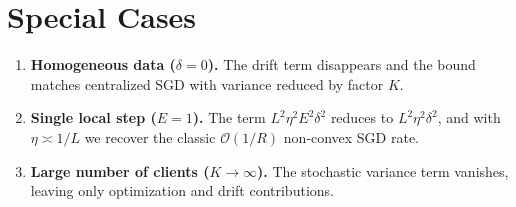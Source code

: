\documentclass{article}
\begin{document}
\section*{Special Cases}
\begin{enumerate}[label=\arabic*)]
    \item \textbf{Homogeneous data ($\delta=0$).} The drift term disappears and the bound matches centralized SGD with variance reduced by factor $K$.
    \item \textbf{Single local step ($E=1$).} The term $L^{2}\eta^{2}E^{2}\delta^{2}$ reduces to $L^{2}\eta^{2}\delta^{2}$, and with $\eta\asymp 1/L$ we recover the classic $\mathcal O(1/R)$ non‑convex SGD rate.
    \item \textbf{Large number of clients ($K\to\infty$).} The stochastic variance term vanishes, leaving only optimization and drift contributions.
\end{enumerate}
\end{document}
